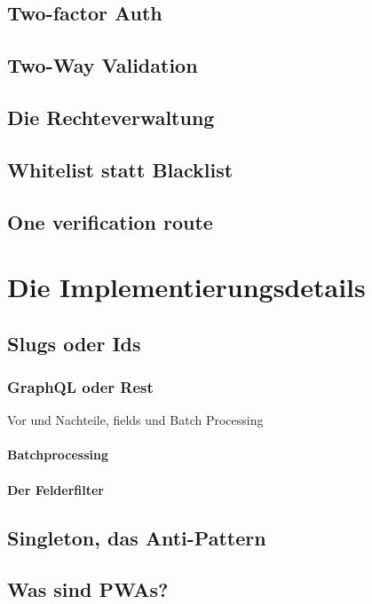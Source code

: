 \section{Two-factor Auth}
\section{Two-Way Validation}
\section{Die Rechteverwaltung}
\section{Whitelist statt Blacklist}
\section{One verification route}

\chapter{Die Implementierungsdetails}

\section{Slugs oder Ids}

\subsection{GraphQL oder Rest}
Vor und Nachteile, fields und Batch Processing

\subsubsection{Batchprocessing}

\subsubsection{Der Felderfilter}

\section{Singleton, das Anti-Pattern}
\section{Was sind PWAs?}

